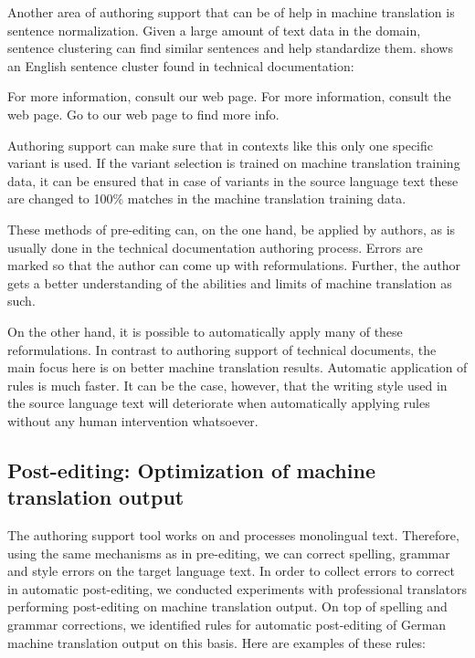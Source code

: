 \documentclass[output=paper]{LSP/langsci}
\begin{document}
\newpage 
Another area of authoring support that can be of help in machine translation is sentence normalization. Given a large amount of text data in the domain, sentence clustering can find similar sentences and help standardize them.  shows an English sentence cluster found in technical documentation:

\begin{exe}
\label{ex:siegel:4}
\ex
\begin{xlist}
\ex
For more information, consult our web page.
\ex
For more information, consult the web page.
\ex
Go to our web page to find more info.
\end{xlist}
\end{exe}

Authoring support can make sure that in contexts like this only one specific variant is used. If the variant selection is trained on machine translation training data, it can be ensured that in case of variants in the source language text these are changed to 100\% matches in the machine translation training data.

These methods of pre-editing can, on the one hand, be applied by authors, as is usually done in the technical documentation authoring process. Errors are marked so that the author can come up with reformulations. Further, the author gets a better understanding of the abilities and limits of machine translation as such.

On the other hand, it is possible to automatically apply many of these reformulations. In contrast to authoring support of technical documents, the main focus here is on better machine translation results. Automatic application of rules is much faster. It can be the case, however, that the writing style used in the source language text will deteriorate when automatically applying rules without any human intervention whatsoever.

\subsection{Post-editing: Optimization of machine translation output}\label{sec:siegel:4.2}

The authoring support tool works on and processes monolingual text. Therefore, using the same mechanisms as in pre-editing, we can correct spelling, grammar and style errors on the target language text. In order to collect errors to correct in automatic post-editing, we conducted experiments with professional translators performing post-editing on machine translation output. On top of spelling and grammar corrections, we identified rules for automatic post-editing of German machine translation output on this basis. Here are examples of these rules:
\end{document}
